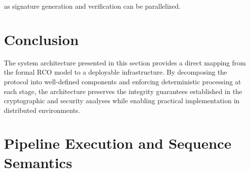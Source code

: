 as signature generation and verification can be parallelized.

\section{Conclusion}

The system architecture presented in this section provides a direct mapping from the formal RCO model to a deployable infrastructure. By decomposing the protocol into well-defined components and enforcing deterministic processing at each stage, the architecture preserves the integrity guarantees established in the cryptographic and security analyses while enabling practical implementation in distributed environments.

\section{Pipeline Execution and Sequence Semantics}

